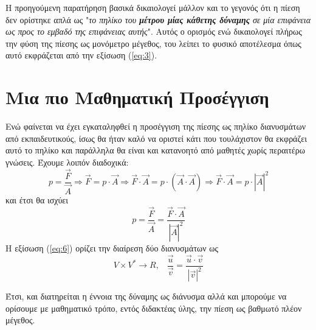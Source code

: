 \documentclass[12pt,titlepage]{article}
\begin{document}
Η προηγούμενη παρατήρηση βασικά δικαιολογεί μάλλον και το γεγονός ότι η πίεση δεν ορίστηκε απλά ως "\textit{το πηλίκο του \textbf{μέτρου μίας κάθετης δύναμης} σε μία επιφάνεια ως προς το εμβαδό της επιφάνειας αυτής}". Αυτός ο ορισμός ενώ δικαιολογεί πλήρως την φύση της πίεσης ως μονόμετρο μέγεθος, του λείπει το φυσικό αποτέλεσμα όπως αυτό εκφράζεται από την εξίσωση (\ref{eq:3}).

\section{Μια πιο Μαθηματική Προσέγγιση}

Ενώ φαίνεται να έχει εγκαταληφθεί η προσέγγιση της πίεσης ως πηλίκο διανυσμάτων από εκπαιδευτικούς, ίσως θα ήταν καλό να οριστεί κάτι που τουλάχιστον θα εκφράζει αυτό το πηλίκο και παράλληλα θα είναι και κατανοητό από μαθητές χωρίς περαιτέρω γνώσεις. Έχουμε λοιπόν διαδοχικά:
\begin{equation} \label{eq:5}
 p=\frac{\vec{F}}{\vec{A}} \Rightarrow \vec{F}=p\cdot \vec{A} \Rightarrow \vec{F}\cdot \vec{A}=p\cdot (\vec{A}\cdot \vec{A}) \Rightarrow \vec{F}\cdot \vec{A}= p\cdot\left| \vec{A} \right|^2
\end{equation}
και έτσι θα ισχύει
\begin{equation} \label{eq:6}
 p=\frac{\vec{F}}{\vec{A}}=\frac{\vec{F}\cdot\vec{A}}{\left| \vec{A} \right|^2}
\end{equation}
Η εξίσωση (\ref{eq:6}) ορίζει την διαίρεση δύο διανυσμάτων ως
\begin{equation} \label{eq:7}
 V\times V^* \to R \text{,}\quad \frac{\vec{u}}{\vec{v}}=\frac{\vec{u} \cdot \vec{v}}{|\vec{v}|^2}
\end{equation}

Έτσι, και διατηρείται η έννοια της δύναμης ως διάνυσμα αλλά και μπορούμε να ορίσουμε με μαθηματικό τρόπο, εντός διδακτέας ύλης, την πίεση ως βαθμωτό πλέον μέγεθος.
\end{document}
